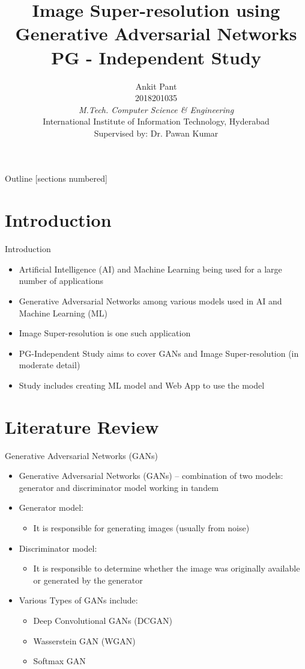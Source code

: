 \documentclass{beamer}
\title{\centering Image Super-resolution using \\ Generative Adversarial Networks\\ \vspace{2mm} \normalsize{PG - Independent Study } \\ \vspace{-5mm}}
\author{Ankit Pant \\ 2018201035 \\ 
	\textit{M.Tech. Computer Science \& Engineering} \\
	International Institute of Information Technology, Hyderabad \\
	Supervised by: Dr. Pawan Kumar
	}
\date{}
\begin{document}
\begin{frame}[plain]
    \maketitle
\end{frame}
\begin{frame}{Outline}
	[sections numbered]
	\tableofcontents
\end{frame}

\section{Introduction}
	\begin{frame}{Introduction}
		\begin{itemize}
			\item Artificial Intelligence (AI) and Machine Learning being used for a large number of applications
			\item Generative Adversarial Networks among various models used in AI and Machine Learning (ML)
			\item  Image Super-resolution is one such application
			\item PG-Independent Study aims to cover GANs and Image Super-resolution (in moderate detail) 
			\item Study includes creating ML model and Web App  to use the model
		\end{itemize}
	\end{frame}

\section{Literature Review}
	\begin{frame}{Generative Adversarial Networks (GANs)}
		\begin{itemize}
			\item Generative Adversarial Networks (GANs) -- combination of two  models: generator and discriminator model working in tandem
			\item Generator model:
			\begin{itemize}
				\item It is responsible for generating images (usually from noise)
			\end{itemize}
			\item Discriminator model:
			\begin{itemize}
				\item It is responsible to determine whether the image was originally available or generated by the generator 
			\end{itemize}
			\item Various Types of GANs include:
			\begin{itemize}
				\item Deep Convolutional GANs (DCGAN)
				\item Wasserstein GAN (WGAN)
				\item Softmax GAN
			\end{itemize}
		\end{itemize}
		
	\end{frame}
\end{document}
